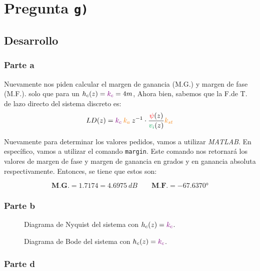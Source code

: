 \section{Pregunta \texttt{g)}}\label{pregunta-g}


\subsection{Desarrollo}

\subsubsection{Parte a}
Nuevamente nos piden calcular el margen de ganancia (M.G.) y margen de fase
(M.F.). solo que para un \(h_c(z)= \mathbin{\color{violet}k_c} = 4m\), Ahora bien, sabemos 
que la F.de T. de lazo directo del sistema discreto es:
\begin{equation}
  LD(z) = \mora{k_{c}} \nara{ k_{a}} z^{-1} \cdot \frac{\rojo{\psi}(z)}{\verd{v_i}(z)} \nara{k_{st}}  
\end{equation}

Nuevamente para determinar los valores pedidos, vamos a utilizar  \textit{MATLAB}. En específico, vamos a utilizar el comando \texttt{margin}. Este comando nos retornará los valores de margen de fase y margen de ganancia en grados y en ganancia absoluta respectivamente. Entonces, se tiene que estos son:

\begin{equation}
  \boxed{\textbf{M.G.} = 1.7174 = 4.6975\ \unit{dB}} \qquad \boxed{\textbf{M.F.} = \ang{-67.6370}}
\end{equation}


\subsubsection{Parte b}

\begin{figure}[h]
  \centering
  
  \caption{Diagrama de Nyquist del sistema con $h_{c}(z) = \mathbin{\color{violet}k_{c}}$.}
  \label{fig:nyquist-g1}
\end{figure}

\begin{figure}[h]
  \centering
  
  \caption{Diagrama de Bode del sistema con $h_{c}(z) = \mathbin{\color{violet}k_{c}}$.}
  \label{fig:bode-g1}
\end{figure}

\subsubsection{Parte d}

